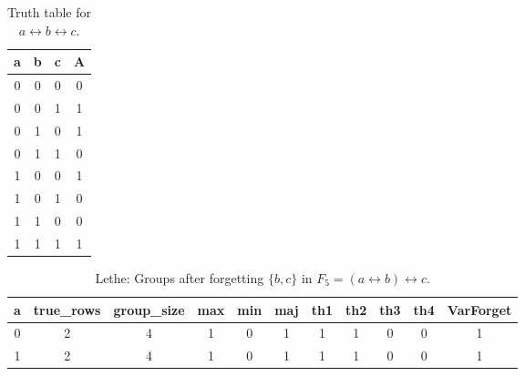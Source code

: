 \begin{table}[!tb]
    \centering
    \begin{tabular}{|c|c|c|c|}
        \hline
        \textbf{a} & \textbf{b} & \textbf{c} & \textbf{A} \\ \hline
        0 & 0 & 0 & 0 \\ \hline
        0 & 0 & 1 & 1 \\ \hline
        0 & 1 & 0 & 1 \\ \hline
        0 & 1 & 1 & 0 \\ \hline
        1 & 0 & 0 & 1 \\ \hline
        1 & 0 & 1 & 0 \\ \hline
        1 & 1 & 0 & 0 \\ \hline
        1 & 1 & 1 & 1 \\ \hline
    \end{tabular}
    \caption{Truth table for $a \leftrightarrow b \leftrightarrow c$.}
    \label{tab:truthtab}
\end{table}

\begin{table}[!tb]
    \centering
    \begin{tabular}{|c|c|c|c|c|c|c|c|c|c|c|}
        \hline
        \textbf{a} & \textbf{true\_rows} & \textbf{group\_size} & \textbf{max} & \textbf{min} & \textbf{maj} & \textbf{th1} & \textbf{th2} & \textbf{th3} & \textbf{th4} & \textbf{VarForget} \\ \hline
        \rowcolor{gray!40} 0 & 2 & 4 & 1 & 0 & 1 & 1 & 1 & 0 & 0 & 1 \\ \hline
        \rowcolor{blue!40} 1 & 2 & 4 & 1 & 0 & 1 & 1 & 1 & 0 & 0 & 1 \\ \hline
    \end{tabular}
    \caption{Lethe: Groups after forgetting $\{b, c\}$ in $F_{5} = (a \leftrightarrow b) \leftrightarrow c$.}
    \label{tab:lethe-F5-bc-groups}
\end{table}
